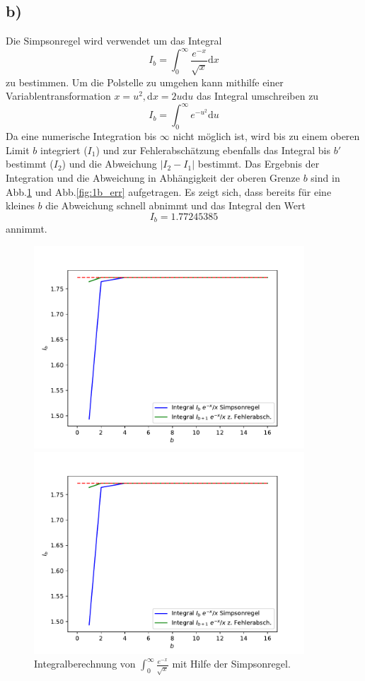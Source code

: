\subsection*{b)}
Die Simpsonregel wird verwendet um das Integral
\[
I_b = \int_0^{\infty} \frac{e^{-x}}{\sqrt{x}} \mathrm{d}x
\]
zu bestimmen. Um die Polstelle zu umgehen kann mithilfe einer Variablentransformation $x=u^2, \mathrm{d}x=2u\mathrm{d}u$
das Integral umschreiben zu 
\[
I_b = \int_0^{\infty} e^{-u^2} \mathrm{d}u
\]
Da eine numerische Integration bis $\infty$ nicht möglich ist, wird bis zu einem oberen Limit $b$ integriert ($I_1$) und zur Fehlerabschätzung ebenfalls das Integral bis $b'$ bestimmt ($I_2$) und die Abweichung $|I_2-I_1|$ bestimmt. Das Ergebnis der Integration und die Abweichung in Abhängigkeit der oberen Grenze $b$ sind in Abb.\ref{fig:1b} und Abb.\ref{fig:1b_err} aufgetragen.
Es zeigt sich, dass bereits für eine kleines $b$ die Abweichung schnell abnimmt und das Integral den Wert
\[
I_b = 1.77245385
\]
annimmt.
\begin{figure}[h!]
\begin{minipage}{0.45\textwidth}
\includegraphics[width=0.9\textwidth]{A1/build/1b.pdf}
\caption{Integralberechnung von $\int_0^{\infty}\frac{e^{-x}}{\sqrt{x}}$ mit Hilfe der Simpsonregel.}
\label{fig:1b}
\end{minipage}
\begin{minipage}{0.45\textwidth}
\includegraphics[width=0.9\textwidth]{A1/build/1b.pdf}
\end{minipage}
\end{figure}


